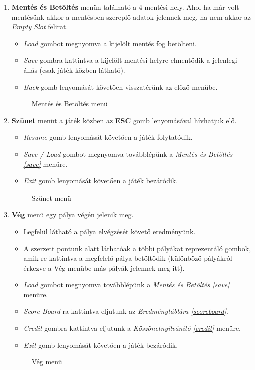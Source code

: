\begin{enumerate}
	\item \label{save} \textbf{Mentés és Betöltés} menün található a 4 mentési hely. Ahol ha már volt mentésünk akkor a mentésben szereplő adatok jelennek meg, ha nem akkor az \textit{Empty Slot} felirat.   
	\begin{itemize}
		\item \textit{Load} gombot megnyomva a kijelölt mentés fog betölteni.
		\item \textit{Save} gombra kattintva a kijelölt mentési helyre elmentődik a jelenlegi állás (csak játék közben látható).
		\item \textit{Back} gomb lenyomását követően visszatérünk az előző menübe.
	\end{itemize}
	\begin{figure}[H]
		\noindent{}
		\caption{Mentés és Betöltés menü}
		\label{saveLoad}
	\end{figure}
	
	\item \label{pause} \textbf{Szünet} menüt a játék közben az \textbf{ESC} gomb lenyomásával hívhatjuk elő.
	\begin{itemize}
		\item \textit{Resume} gomb lenyomását követően a játék folytatódik.
		\item \textit{Save / Load} gombot megnyomva továbblépünk a \textit{Mentés és Betöltés \ref{save}} menüre.
		\item \textit{Exit} gomb lenyomását követően a játék bezáródik.
	\end{itemize}
	\begin{figure}[H]
		\noindent{}
		\caption{Szünet menü}
		\label{pauseF}
	\end{figure}
	
	\item \label{end} \textbf{Vég} menü egy pálya végén jelenik meg.
	\begin{itemize}
		\item Legfelül látható a pálya elvégzését követő eredményünk.
		\item A szerzett pontunk alatt láthatóak a többi pályákat reprezentáló gombok, amik re kattintva a megfelelő pálya betöltődik (különböző pályákról érkezve a Vég menübe más pályák jelennek meg itt).
		\item \textit{Load} gombot megnyomva továbblépünk a \textit{Mentés és Betöltés \ref{save}} menüre.
		\item \textit{Score Board}-ra kattintva eljutunk az \textit{Eredménytáblára \ref{scoreboard}}.
		\item \textit{Credit} gombra kattintva eljutunk a \textit{Köszönetnyilvánító \ref{credit}} menüre.
		\item \textit{Exit} gomb lenyomását követően a játék bezáródik.
	\end{itemize}
	\begin{figure}[H]
		\noindent{}
		\caption{Vég menü}
		\label{endF}
	\end{figure}
	

\end{enumerate}
